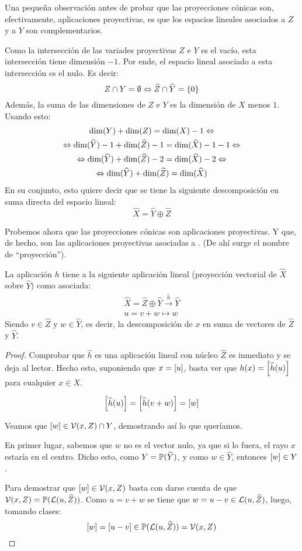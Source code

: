 Una pequeña observación antes de probar que las proyecciones cónicas son, efectivamente, aplicaciones proyectivas, es que los espacios lineales asociados a $Z$ y a $Y$ son complementarios.
\begin{obs}
	\label{C4_obs_espaciosComplementarios}
	Como la intersección de las variades proyectivas $Z$ e $Y$ es el vacío, esta intersección tiene dimensión $-1$. Por ende, el espacio lineal asociado a esta intersección es el nulo. Es decir:
	\[Z\cap Y=\emptyset\Leftrightarrow\widehat{Z}\cap\widehat{Y}=\{0\}\]
	Además, la suma de las dimensiones de $Z$ e $Y$ es la dimensión de $X$ menos $1$. Usando esto:
	\begin{multline*}
		\dim(Y)+\dim(Z)=\dim(X)-1\Leftrightarrow\\
		\Leftrightarrow \dim(\widehat{Y})-1+\dim(\widehat{Z})-1=\dim(\widehat{X})-1-1\Leftrightarrow\\
		\Leftrightarrow \dim(\widehat{Y})+\dim(\widehat{Z})-2=\dim(\widehat{X})-2\Leftrightarrow\\
		\Leftrightarrow \dim(\widehat{Y})+\dim(\widehat{Z})=\dim(\widehat{X})
	\end{multline*}
	En su conjunto, esto quiere decir que se tiene la siguiente descomposición en suma directa del espacio lineal:
	\[\widehat{X}=\widehat{Y}\oplus\widehat{Z}\]
\end{obs}
Probemos ahora que las proyecciones cónicas son aplicaciones proyectivas. Y que, de hecho, son las aplicaciones proyectivas asociadas a . (De ahí surge el nombre de ``proyección'').
\begin{prop}
	\label{C4_prop_proyeccionVectorial}
	La aplicación $h$ tiene a la siguiente aplicación lineal (proyección vectorial de $\widehat{X}$ sobre $\widehat{Y}$) como asociada:
	\[\begin{array}{c}
	\widehat{X}=\widehat{Z}\oplus\widehat{Y}\stackrel{\widehat{h}}{\to}\widehat{Y}\\
	u=v+w\mapsto w
	\end{array}\]
	Siendo $v\in \widehat{Z}$ y $w\in \widehat{Y}$, es decir, la descomposición de $x$ en suma de vectores de $\widehat{Z}$ y $\widehat{Y}$.
\end{prop}
\begin{proof}
	Comprobar que $\widehat{h}$ es una aplicación lineal con núcleo $\widehat{Z}$ es inmediato y se deja al lector. Hecho esto, suponiendo que $x=\left [ u \right ]$, basta ver que $h(x)=\left [ \widehat{h}(u) \right ]$ para cualquier $x\in X$.
	
	\[\left [ \widehat{h}(u) \right ]=\left [ \widehat{h}(v+w) \right ]=\left [ w \right ]\]
	
	Veamos que $\left [ w \right ]\in \mathcal{V}(x,Z)\cap Y$, demostrando así lo que queríamos.
	
	En primer lugar, sabemos que $w$ no es el vector nulo, ya que si lo fuera, el rayo $x$ estaría en el centro. Dicho esto, como $Y=\mathbb{P}(\widehat{Y})$, y como $w\in\widehat{Y}$, entonces $\left [ w \right ]\in Y$.
	
	Para demostrar que $\left [ w \right ]\in\mathcal{V}(x,Z)$ basta con darse cuenta de que $\mathcal{V}(x,Z)=\mathbb{P}({\mathcal{L}(u,\widehat{Z})})$. Como $u = v+w$ se tiene que $w=u-v\in\mathcal{L}(u, \widehat{Z})$, luego, tomando clases: \[\left [ w \right ]=\left [ u-v \right ]\in\mathbb{P}(\mathcal{L}(u,\widehat{Z}))=\mathcal{V}(x,Z)\]
\end{proof}
